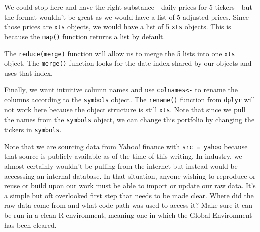 \documentclass[]{krantz}
\makeatletter
\newenvironment{Shaded}{\begin{snugshade}}{\end{snugshade}}
\newcommand{\KeywordTok}[1]{\textcolor[rgb]{0.13,0.29,0.53}{\textbf{#1}}}
\newcommand{\DataTypeTok}[1]{\textcolor[rgb]{0.13,0.29,0.53}{#1}}
\newcommand{\StringTok}[1]{\textcolor[rgb]{0.31,0.60,0.02}{#1}}
\newcommand{\OtherTok}[1]{\textcolor[rgb]{0.56,0.35,0.01}{#1}}
\newcommand{\OperatorTok}[1]{\textcolor[rgb]{0.81,0.36,0.00}{\textbf{#1}}}
\newcommand{\NormalTok}[1]{#1}
\newenvironment{kframe}{%
\medskip{}
\setlength{\fboxsep}{.8em}
 \def\at@end@of@kframe{}%
 \ifinner\ifhmode%
  \def\at@end@of@kframe{\end{minipage}}%
  \begin{minipage}{\columnwidth}%
 \fi\fi%
 \def\FrameCommand##1{\hskip\@totalleftmargin \hskip-\fboxsep
 \colorbox{shadecolor}{##1}\hskip-\fboxsep
     \hskip-\linewidth \hskip-\@totalleftmargin \hskip\columnwidth}%
 \MakeFramed {\advance\hsize-\width
   \@totalleftmargin\z@ \linewidth\hsize
   \@setminipage}}%
 {\par\unskip\endMakeFramed%
 \at@end@of@kframe}
\renewenvironment{Shaded}{\begin{kframe}}{\end{kframe}}
\makeatother
\begin{document}
We could stop here and have the right substance - daily prices for 5
tickers - but the format wouldn't be great as we would have a list of 5
adjusted prices. Since those prices are \texttt{xts} objects, we would
have a list of 5 \texttt{xts} objects. This is because the
\texttt{map()} function returns a list by default.

The \texttt{reduce(merge)} function will allow us to merge the 5 lists
into one \texttt{xts} object. The \texttt{merge()} function looks for
the date index shared by our objects and uses that index.

Finally, we want intuitive column names and use
\texttt{colnames\textless{}-} to rename the columns according to the
\texttt{symbols} object. The \texttt{rename()} function from
\texttt{dplyr} will not work here because the object structure is still
\texttt{xts}. Note that since we pull the names from the
\texttt{symbols} object, we can change this portfolio by changing the
tickers in \texttt{symbols}.

\begin{Shaded}
\end{Shaded}

Note that we are sourcing data from Yahoo! finance with
\texttt{src\ =\ \textquotesingle{}yahoo\textquotesingle{}} because that
source is publicly available as of the time of this writing. In
industry, we almost certainly wouldn't be pulling from the internet but
instead would be accesssing an internal database. In that situation,
anyone wishing to reproduce or reuse or build upon our work must be able
to import or update our raw data. It's a simple but oft overlooked first
step that needs to be made clear. Where did the raw data come from and
what code path was used to access it? Make sure it can be run in a clean
R environment, meaning one in which the Global Environment has been
cleared.
\end{document}
